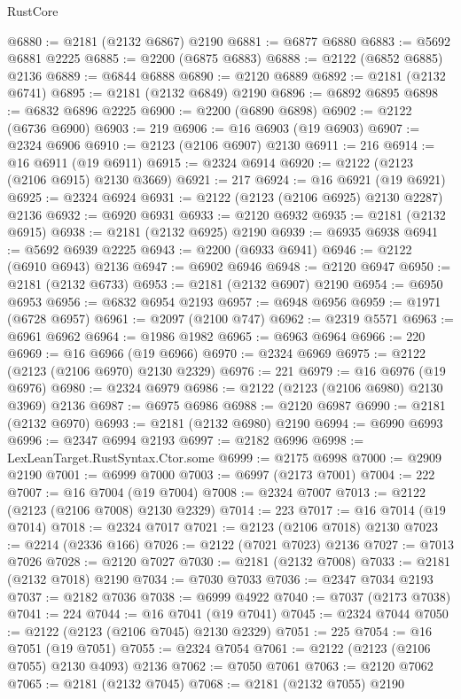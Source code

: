 \begin{lexlean}{RustCore}
\begin{coremodule}
@6880 := @2181 (@2132 @6867) @2190
@6881 := @6877 @6880
@6883 := @5692 @6881 @2225
@6885 := @2200 (@6875 @6883)
@6888 := @2122 (@6852 @6885) @2136
@6889 := @6844 @6888
@6890 := @2120 @6889
@6892 := @2181 (@2132 @6741)
@6895 := @2181 (@2132 @6849) @2190
@6896 := @6892 @6895
@6898 := @6832 @6896 @2225
@6900 := @2200 (@6890 @6898)
@6902 := @2122 (@6736 @6900)
@6903 := 219
@6906 := @16 @6903 (@19 @6903)
@6907 := @2324 @6906
@6910 := @2123 (@2106 @6907) @2130
@6911 := 216
@6914 := @16 @6911 (@19 @6911)
@6915 := @2324 @6914
@6920 := @2122 (@2123 (@2106 @6915) @2130 @3669)
@6921 := 217
@6924 := @16 @6921 (@19 @6921)
@6925 := @2324 @6924
@6931 := @2122 (@2123 (@2106 @6925) @2130 @2287) @2136
@6932 := @6920 @6931
@6933 := @2120 @6932
@6935 := @2181 (@2132 @6915)
@6938 := @2181 (@2132 @6925) @2190
@6939 := @6935 @6938
@6941 := @5692 @6939 @2225
@6943 := @2200 (@6933 @6941)
@6946 := @2122 (@6910 @6943) @2136
@6947 := @6902 @6946
@6948 := @2120 @6947
@6950 := @2181 (@2132 @6733)
@6953 := @2181 (@2132 @6907) @2190
@6954 := @6950 @6953
@6956 := @6832 @6954 @2193
@6957 := @6948 @6956
@6959 := @1971 (@6728 @6957)
@6961 := @2097 (@2100 @747)
@6962 := @2319 @5571
@6963 := @6961 @6962
@6964 := @1986 @1982
@6965 := @6963 @6964
@6966 := 220
@6969 := @16 @6966 (@19 @6966)
@6970 := @2324 @6969
@6975 := @2122 (@2123 (@2106 @6970) @2130 @2329)
@6976 := 221
@6979 := @16 @6976 (@19 @6976)
@6980 := @2324 @6979
@6986 := @2122 (@2123 (@2106 @6980) @2130 @3969) @2136
@6987 := @6975 @6986
@6988 := @2120 @6987
@6990 := @2181 (@2132 @6970)
@6993 := @2181 (@2132 @6980) @2190
@6994 := @6990 @6993
@6996 := @2347 @6994 @2193
@6997 := @2182 @6996
@6998 := LexLeanTarget.RustSyntax.Ctor.some
@6999 := @2175 @6998
@7000 := @2909 @2190
@7001 := @6999 @7000
@7003 := @6997 (@2173 @7001)
@7004 := 222
@7007 := @16 @7004 (@19 @7004)
@7008 := @2324 @7007
@7013 := @2122 (@2123 (@2106 @7008) @2130 @2329)
@7014 := 223
@7017 := @16 @7014 (@19 @7014)
@7018 := @2324 @7017
@7021 := @2123 (@2106 @7018) @2130
@7023 := @2214 (@2336 @166)
@7026 := @2122 (@7021 @7023) @2136
@7027 := @7013 @7026
@7028 := @2120 @7027
@7030 := @2181 (@2132 @7008)
@7033 := @2181 (@2132 @7018) @2190
@7034 := @7030 @7033
@7036 := @2347 @7034 @2193
@7037 := @2182 @7036
@7038 := @6999 @4922
@7040 := @7037 (@2173 @7038)
@7041 := 224
@7044 := @16 @7041 (@19 @7041)
@7045 := @2324 @7044
@7050 := @2122 (@2123 (@2106 @7045) @2130 @2329)
@7051 := 225
@7054 := @16 @7051 (@19 @7051)
@7055 := @2324 @7054
@7061 := @2122 (@2123 (@2106 @7055) @2130 @4093) @2136
@7062 := @7050 @7061
@7063 := @2120 @7062
@7065 := @2181 (@2132 @7045)
@7068 := @2181 (@2132 @7055) @2190

\end{coremodule}
\end{lexlean}
